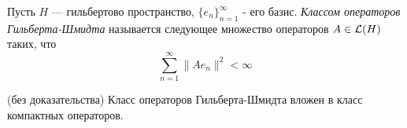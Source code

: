 \begin{definition}
	Пусть $H$ --- гильбертово пространство, $\{e_n\}_{n = 1}^\infty$ - его базис. \textit{Классом операторов Гильберта-Шмидта} называется следующее множество операторов $A \in \mathcal{L}(H)$ таких, что
	\[
		\sum_{n = 1}^\infty \|Ae_n\|^2 < \infty
	\]
\end{definition}

\begin{proposition} (без доказательства)
	Класс операторов Гильберта-Шмидта вложен в класс компактных операторов.
\end{proposition}
